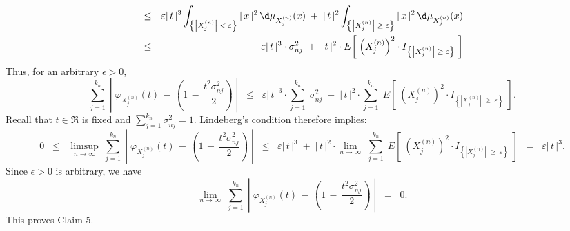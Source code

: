 {\begin{eqnarray*}
\\
&\leq&
\varepsilon \vert\,t\,\vert^{3} \int_{\left\{\left\vert X^{(n)}_{j} \right\vert\;<\;\varepsilon\right\}} \vert\,x\,\vert^{2} \,\d\mu_{X^{(n)}_{j}}(x)
\;+\;
\vert\,t\,\vert^{2} \int_{\left\{\left\vert X^{(n)}_{j} \right\vert\;\geq\;\varepsilon\right\}} \vert\,x\,\vert^{2} \,\d\mu_{X^{(n)}_{j}}(x)
\\
&\leq&
\varepsilon \vert\,t\,\vert^{3}\cdot\sigma^{2}_{nj}
\;+\;
\vert\,t\,\vert^{2}\cdot E\!\left[\;\left(X^{(n)}_{j}\right)^{2} \cdot I_{\left\{\left\vert X^{(n)}_{j} \right\vert\;\geq\;\varepsilon\right\}} \;\right]
\end{eqnarray*}
Thus, for an arbitrary $\epsilon > 0$,
\begin{equation*}
\sum_{j=1}^{k_{n}}\;
\left\vert\;
\varphi_{X^{(n)}_{j}}(t) \, - \, \left(1 \, - \, \dfrac{t^{2}\sigma^{2}_{nj}}{2}\right)
\;\right\vert
\;\;\leq\;\;
\varepsilon \vert\,t\,\vert^{3}\cdot \sum_{j=1}^{k_{n}}\;\sigma^{2}_{nj}
\;+\;
\vert\,t\,\vert^{2}\cdot
\sum_{j=1}^{k_{n}}\;E\!\left[\;\left(X^{(n)}_{j}\right)^{2} \cdot I_{\left\{\left\vert X^{(n)}_{j} \right\vert\;\geq\;\varepsilon\right\}} \;\right].
\end{equation*}
Recall that $t \in \Re$ is fixed and $\sum_{j=1}^{k_{n}}\sigma^{2}_{nj} = 1$.
Lindeberg's condition therefore implies:
\begin{equation*}
0\;\;\leq\;\;
\limsup_{n\rightarrow\infty}\;
\sum_{j=1}^{k_{n}}\;
\left\vert\;
\varphi_{X^{(n)}_{j}}(t) \, - \, \left(1 \, - \, \dfrac{t^{2}\sigma^{2}_{nj}}{2}\right)
\;\right\vert
\;\;\leq\;\;
\varepsilon \vert\,t\,\vert^{3}
\;+\;
\vert\,t\,\vert^{2}\cdot
\lim_{n\rightarrow\infty}\;
\sum_{j=1}^{k_{n}}\;E\!\left[\;\left(X^{(n)}_{j}\right)^{2} \cdot I_{\left\{\left\vert X^{(n)}_{j} \right\vert\;\geq\;\varepsilon\right\}} \;\right]
\;\;=\;\;
\varepsilon \vert\,t\,\vert^{3}.
\end{equation*}
Since $\epsilon > 0$ is arbitrary, we have
\begin{equation*}
\lim_{n\rightarrow\infty}\;
\sum_{j=1}^{k_{n}}\;
\left\vert\;
\varphi_{X^{(n)}_{j}}(t) \, - \, \left(1 \, - \, \dfrac{t^{2}\sigma^{2}_{nj}}{2}\right)
\;\right\vert
\;\;=\;\; 0.
\end{equation*}
This proves Claim 5.
}

